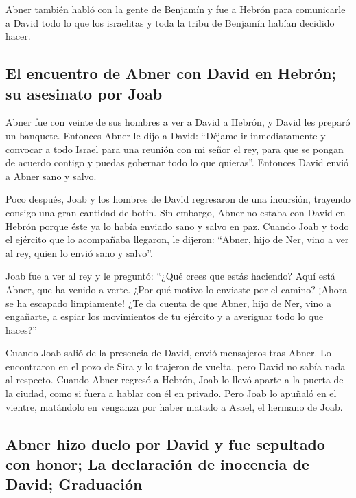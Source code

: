  Abner también habló con la gente de Benjamín y fue a
Hebrón para comunicarle a David todo lo que los israelitas y toda la
tribu de Benjamín habían decidido hacer.

\hypertarget{el-encuentro-de-abner-con-david-en-hebruxf3n-su-asesinato-por-joab}{%
\subsection{El encuentro de Abner con David en Hebrón; su asesinato por
Joab}\label{el-encuentro-de-abner-con-david-en-hebruxf3n-su-asesinato-por-joab}}

 Abner fue con veinte de sus hombres a ver a David a
Hebrón, y David les preparó un banquete.  Entonces Abner
le dijo a David: ``Déjame ir inmediatamente y convocar a todo Israel
para una reunión con mi señor el rey, para que se pongan de acuerdo
contigo y puedas gobernar todo lo que quieras''. Entonces David envió a
Abner sano y salvo.

 Poco después, Joab y los hombres de David regresaron de
una incursión, trayendo consigo una gran cantidad de botín. Sin embargo,
Abner no estaba con David en Hebrón porque éste ya lo había enviado sano
y salvo en paz.  Cuando Joab y todo el ejército que lo
acompañaba llegaron, le dijeron: ``Abner, hijo de Ner, vino a ver al
rey, quien lo envió sano y salvo''.

 Joab fue a ver al rey y le preguntó: ``¿Qué crees que
estás haciendo? Aquí está Abner, que ha venido a verte. ¿Por qué motivo
lo enviaste por el camino? ¡Ahora se ha escapado limpiamente!
 ¿Te da cuenta de que Abner, hijo de Ner, vino a
engañarte, a espiar los movimientos de tu ejército y a averiguar todo lo
que haces?''

 Cuando Joab salió de la presencia de David, envió
mensajeros tras Abner. Lo encontraron en el pozo de Sira y lo trajeron
de vuelta, pero David no sabía nada al respecto.  Cuando
Abner regresó a Hebrón, Joab lo llevó aparte a la puerta de la ciudad,
como si fuera a hablar con él en privado. Pero Joab lo apuñaló en el
vientre, matándolo en venganza por haber matado a Asael, el hermano de
Joab.

\hypertarget{abner-hizo-duelo-por-david-y-fue-sepultado-con-honor-la-declaraciuxf3n-de-inocencia-de-david-graduaciuxf3n}{%
\subsection{Abner hizo duelo por David y fue sepultado con honor; La
declaración de inocencia de David;
Graduación}\label{abner-hizo-duelo-por-david-y-fue-sepultado-con-honor-la-declaraciuxf3n-de-inocencia-de-david-graduaciuxf3n}}

